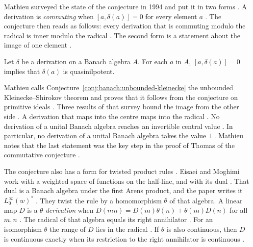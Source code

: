 Mathieu surveyed the state of the conjecture in 1994 and put it in two forms
\cite[p.~238]{Mathieu1994Image}. A derivation is \emph{commuting} when
$[a,\delta(a)]=0$ for every element $a$ \cite[p.~238]{Mathieu1994Image}. The
conjecture then reads as follows: every derivation that is commuting modulo the
radical is inner modulo the radical \cite[Conjecture~1, p.~238]{Mathieu1994Image}.
The second form is a statement about the image of one element
\cite[p.~242]{Mathieu1994Image}.

\begin{conjecture}\label{conj:banach:unbounded-kleinecke}
Let $\delta$ be a derivation on a Banach algebra $A$. For each $a$ in $A$,
$[a,\delta(a)]=0$ implies that $\delta(a)$ is quasinilpotent.
\end{conjecture}

Mathieu calls Conjecture~\ref{conj:banach:unbounded-kleinecke} the unbounded
Kleinecke--Shirokov theorem and proves that it follows from the
conjecture on primitive ideals \cite[p.~242]{Mathieu1994Image}. Three results of that survey bound the image from the other side
\cite[pp.~243--245]{Mathieu1994Image}. A derivation
that maps into the centre maps into the radical
\cite[Theorem~7, p.~243]{Mathieu1994Image}. No derivation of a unital Banach
algebra reaches an invertible central value
\cite[Theorem~8, p.~245]{Mathieu1994Image}. In particular, no derivation of a
unital Banach algebra takes the value $1$
\cite[Corollary~9, p.~245]{Mathieu1994Image}. Mathieu notes that the last
statement was the key step in the proof of Thomas of the commutative conjecture
\cite[p.~245]{Mathieu1994Image}.

The conjecture also has a form for twisted product rules
\cite[p.~1]{EisaeiMoghimi2024Theta}. Eisaei and Moghimi work with a
weighted space of functions on the half-line, and with its dual
\cite[p.~2]{EisaeiMoghimi2024Theta}. That dual is a Banach algebra under the
first Arens product, and the paper writes it $L^\infty_0(w)^*$
\cite[p.~2]{EisaeiMoghimi2024Theta}. They twist the rule by a homomorphism
$\theta$ of that algebra. A linear map $D$ is a
\emph{$\theta$-derivation} when $D(mn)=D(m)\theta(n)+\theta(m)D(n)$ for all
$m,n$ \cite[p.~1]{EisaeiMoghimi2024Theta}. The radical of that algebra equals
its right annihilator \cite[p.~3]{EisaeiMoghimi2024Theta}. For an isomorphism
$\theta$ the range of $D$ lies in the radical
\cite[Theorem~2.1, p.~4]{EisaeiMoghimi2024Theta}. If $\theta$ is also
continuous, then $D$ is continuous exactly when its restriction to the right
annihilator is continuous \cite[Proposition~2.3, p.~5]{EisaeiMoghimi2024Theta}.

